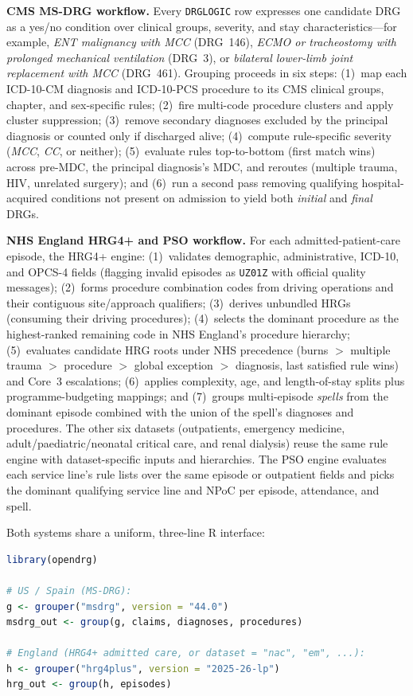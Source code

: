 \documentclass[fleqn,10pt]{IOMEDArticle}
\begin{document}
\textbf{CMS MS-DRG workflow.} Every \texttt{DRGLOGIC} row expresses one candidate DRG as a yes/no condition over clinical groups, severity, and stay characteristics---for example, \emph{ENT malignancy with MCC} (DRG~146), \emph{ECMO or tracheostomy with prolonged mechanical ventilation} (DRG~3), or \emph{bilateral lower-limb joint replacement with MCC} (DRG~461). Grouping proceeds in six steps: (1)~map each ICD-10-CM diagnosis and ICD-10-PCS procedure to its CMS clinical groups, chapter, and sex-specific rules; (2)~fire multi-code procedure clusters and apply cluster suppression; (3)~remove secondary diagnoses excluded by the principal diagnosis or counted only if discharged alive; (4)~compute rule-specific severity (\emph{MCC}, \emph{CC}, or neither); (5)~evaluate rules top-to-bottom (first match wins) across pre-MDC, the principal diagnosis's MDC, and reroutes (multiple trauma, HIV, unrelated surgery); and (6)~run a second pass removing qualifying hospital-acquired conditions not present on admission to yield both \emph{initial} and \emph{final} DRGs.

\textbf{NHS England HRG4+ and PSO workflow.} For each admitted-patient-care episode, the HRG4+ engine: (1)~validates demographic, administrative, ICD-10, and OPCS-4 fields (flagging invalid episodes as \texttt{UZ01Z} with official quality messages); (2)~forms procedure combination codes from driving operations and their contiguous site/approach qualifiers; (3)~derives unbundled HRGs (consuming their driving procedures); (4)~selects the dominant procedure as the highest-ranked remaining code in NHS England's procedure hierarchy; (5)~evaluates candidate HRG roots under NHS precedence (burns $>$ multiple trauma $>$ procedure $>$ global exception $>$ diagnosis, last satisfied rule wins) and Core~3 escalations; (6)~applies complexity, age, and length-of-stay splits plus programme-budgeting mappings; and (7)~groups multi-episode \emph{spells} from the dominant episode combined with the union of the spell's diagnoses and procedures. The other six datasets (outpatients, emergency medicine, adult/paediatric/neonatal critical care, and renal dialysis) reuse the same rule engine with dataset-specific inputs and hierarchies. The PSO engine evaluates each service line's rule lists over the same episode or outpatient fields and picks the dominant qualifying service line and NPoC per episode, attendance, and spell.

Both systems share a uniform, three-line R interface:

\noindent\begin{minipage}{\linewidth}
\begin{lstlisting}[language=R]
library(opendrg)

# US / Spain (MS-DRG):
g <- grouper("msdrg", version = "44.0")
msdrg_out <- group(g, claims, diagnoses, procedures)

# England (HRG4+ admitted care, or dataset = "nac", "em", ...):
h <- grouper("hrg4plus", version = "2025-26-lp")
hrg_out <- group(h, episodes)
\end{lstlisting}
\end{minipage}
\end{document}
